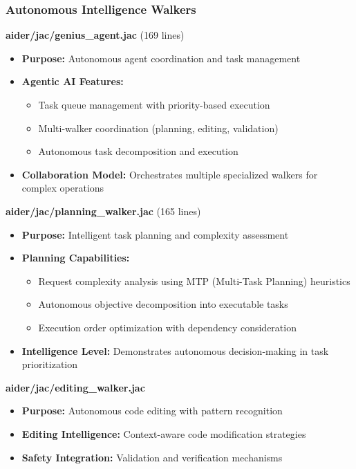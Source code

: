\documentclass[12pt,a4paper]{article}
\begin{document}
\subsubsection{Autonomous Intelligence Walkers}

\textbf{aider/jac/genius\_agent.jac} (169 lines)
\begin{itemize}
    \item \textbf{Purpose:} Autonomous agent coordination and task management
    \item \textbf{Agentic AI Features:}
    \begin{itemize}
        \item Task queue management with priority-based execution
        \item Multi-walker coordination (planning, editing, validation)
        \item Autonomous task decomposition and execution
    \end{itemize}
    \item \textbf{Collaboration Model:} Orchestrates multiple specialized walkers for complex operations
\end{itemize}

\textbf{aider/jac/planning\_walker.jac} (165 lines)
\begin{itemize}
    \item \textbf{Purpose:} Intelligent task planning and complexity assessment
    \item \textbf{Planning Capabilities:}
    \begin{itemize}
        \item Request complexity analysis using MTP (Multi-Task Planning) heuristics
        \item Autonomous objective decomposition into executable tasks
        \item Execution order optimization with dependency consideration
    \end{itemize}
    \item \textbf{Intelligence Level:} Demonstrates autonomous decision-making in task prioritization
\end{itemize}

\textbf{aider/jac/editing\_walker.jac}
\begin{itemize}
    \item \textbf{Purpose:} Autonomous code editing with pattern recognition
    \item \textbf{Editing Intelligence:} Context-aware code modification strategies
    \item \textbf{Safety Integration:} Validation and verification mechanisms
\end{itemize}
\end{document}
